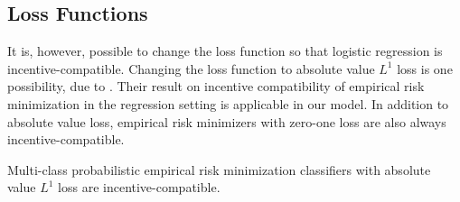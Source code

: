 \documentclass{article}
\begin{document}
\subsection{Loss Functions}
It is, however, possible to change the loss function so that logistic regression is incentive-compatible. Changing the loss function to absolute value $L^{1}$ loss is one possibility, due to \citet*{dekel2010incentive}. Their result on incentive compatibility of empirical risk minimization in the regression setting is applicable in our model. In addition to absolute value loss, empirical risk minimizers with zero-one loss are also always incentive-compatible.
\newline \newline
\begin{prop} \label{prop:dfp} 
Multi-class probabilistic empirical risk minimization classifiers with absolute value $L^{1}$ loss are incentive-compatible.
\end{prop}
\end{document}
